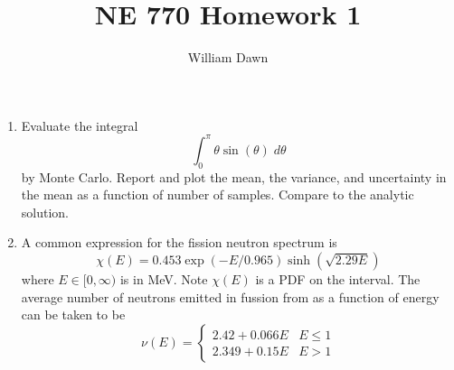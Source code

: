 \documentclass{article}
\title{NE 770 Homework 1}
\author{William Dawn}
\begin{document}
\maketitle

\begin{enumerate}
    \item Evaluate the integral
      \begin{equation}
          \int_0^{\pi} \theta \sin(\theta) \; d\theta
      \end{equation}
      by Monte Carlo. Report and plot the mean, the variance, and uncertainty in
      the mean as a function of number of samples. Compare to the analytic 
      solution.
    \item A common expression for the fission neutron spectrum is 
      \begin{equation}
          \chi(E) = 0.453 \exp(-E/0.965) \sinh\left(\sqrt{2.29E}\right)
      \end{equation}
      where $E \in [0,\infty)$ is in MeV. Note $\chi(E)$ is a PDF on the
      interval. The average number of neutrons emitted in fussion from 
       as a function of energy can be taken to be
      \begin{equation}
        \nu(E) = 
        \begin{cases}
          2.42 + 0.066 E & E \le 1 \\
          2.349 + 0.15 E & E >   1
        \end{cases}
      \end{equation}
\end{enumerate}
\end{document}
